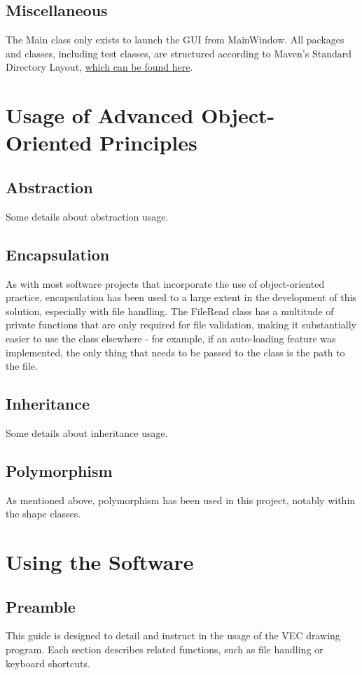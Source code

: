 \documentclass[12pt]{article} %
\begin{document}
\subsection{Miscellaneous}
The Main class only exists to launch the GUI from MainWindow. All packages and classes, including test classes, are structured according to Maven's Standard Directory Layout, {\color{blue} \href{https://maven.apache.org/guides/introduction/introduction-to-the-standard-directory-layout.html}{which can be found here}}.
\newpage

\section{Usage of Advanced Object-Oriented Principles}
\subsection{Abstraction}
Some details about abstraction usage.
\subsection{Encapsulation}
As with most software projects that incorporate the use of object-oriented practice, encapsulation has been used to a large extent in the development of this solution, especially with file handling. The FileRead class has a multitude of private functions that are only required for file validation, making it substantially easier to use the class elsewhere - for example, if an auto-loading feature was implemented, the only thing that needs to be passed to the class is the path to the file.
\subsection{Inheritance}
Some details about inheritance usage.
\subsection{Polymorphism}
As mentioned above, polymorphism has been used in this project, notably within the shape classes. 

\newpage

\section{Using the Software}

\subsection{Preamble}
This guide is designed to detail and instruct in the usage of the VEC drawing program. Each section describes related functions, such as file handling or keyboard shortcuts.
\end{document}
